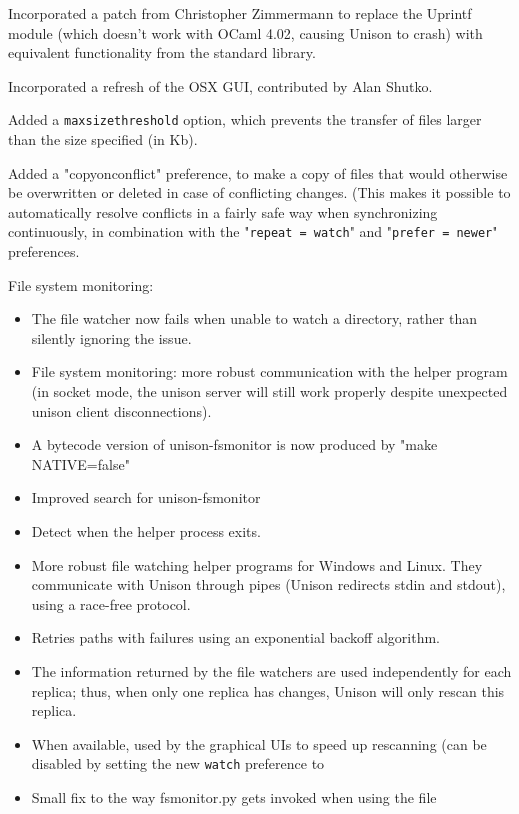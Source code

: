 \begin{changesfromversion}{2.45}
\item Incorporated a patch from Christopher Zimmermann to replace the
  Uprintf module (which doesn't work with OCaml 4.02, causing Unison to crash) with equivalent
  functionality from the standard library.
\item Incorporated a refresh of the OSX GUI, contributed by Alan Shutko.
\item Added a {\tt maxsizethreshold} option, which prevents the transfer of
  files larger than the size specified (in Kb).
\item Added a "copyonconflict" preference, to make a copy of files that would
  otherwise be overwritten or deleted in case of conflicting changes.
  (This makes it possible to automatically resolve conflicts in a
   fairly safe way when synchronizing continuously, in combination
   with the "{\tt repeat = watch}" and "{\tt prefer = newer}" preferences.
\item  File system monitoring:
\begin{itemize}
\item
The file watcher now fails when unable to
  watch a directory, rather than silently ignoring the issue.
\item File system monitoring: more robust communication with the helper program
  (in socket mode, the unison server will still work properly despite
  unexpected unison client disconnections).
\item A bytecode version of unison-fsmonitor is now produced by "make NATIVE=false"
\item Improved search for unison-fsmonitor
\item Detect when the helper process exits.
\item More robust file watching helper programs for Windows and Linux.
  They communicate with Unison through pipes (Unison redirects stdin
  and stdout), using a race-free protocol.
\item Retries paths with failures using an exponential backoff algorithm.
\item  The information returned by the file watchers are used
    independently for each replica; thus, when only one replica has
    changes, Unison will only rescan this replica.
\item When available, used by the graphical UIs to speed up rescanning
    (can be disabled by setting the new {\tt watch} preference to
\item Small fix to the way fsmonitor.py gets invoked when using the file

\end{itemize}
\end{changesfromversion}
